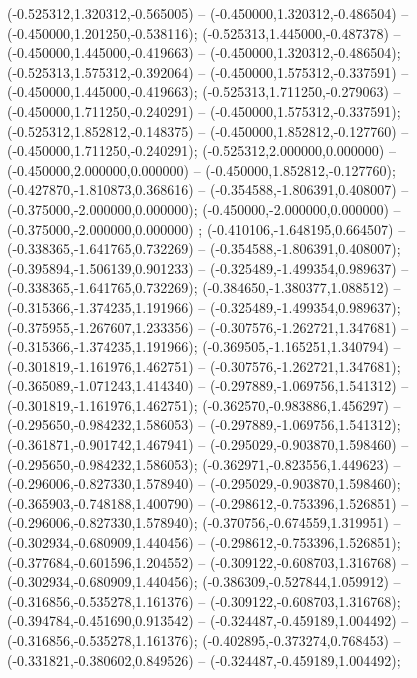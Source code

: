  (-0.525312,1.320312,-0.565005) -- (-0.450000,1.320312,-0.486504) -- (-0.450000,1.201250,-0.538116);
 (-0.525313,1.445000,-0.487378) -- (-0.450000,1.445000,-0.419663) -- (-0.450000,1.320312,-0.486504);
 (-0.525313,1.575312,-0.392064) -- (-0.450000,1.575312,-0.337591) -- (-0.450000,1.445000,-0.419663);
 (-0.525313,1.711250,-0.279063) -- (-0.450000,1.711250,-0.240291) -- (-0.450000,1.575312,-0.337591);
 (-0.525312,1.852812,-0.148375) -- (-0.450000,1.852812,-0.127760) -- (-0.450000,1.711250,-0.240291);
 (-0.525312,2.000000,0.000000) -- (-0.450000,2.000000,0.000000) -- (-0.450000,1.852812,-0.127760);
 (-0.427870,-1.810873,0.368616) -- (-0.354588,-1.806391,0.408007) -- (-0.375000,-2.000000,0.000000);
 (-0.450000,-2.000000,0.000000) -- (-0.375000,-2.000000,0.000000) ;
 (-0.410106,-1.648195,0.664507) -- (-0.338365,-1.641765,0.732269) -- (-0.354588,-1.806391,0.408007);
 (-0.395894,-1.506139,0.901233) -- (-0.325489,-1.499354,0.989637) -- (-0.338365,-1.641765,0.732269);
 (-0.384650,-1.380377,1.088512) -- (-0.315366,-1.374235,1.191966) -- (-0.325489,-1.499354,0.989637);
 (-0.375955,-1.267607,1.233356) -- (-0.307576,-1.262721,1.347681) -- (-0.315366,-1.374235,1.191966);
 (-0.369505,-1.165251,1.340794) -- (-0.301819,-1.161976,1.462751) -- (-0.307576,-1.262721,1.347681);
 (-0.365089,-1.071243,1.414340) -- (-0.297889,-1.069756,1.541312) -- (-0.301819,-1.161976,1.462751);
 (-0.362570,-0.983886,1.456297) -- (-0.295650,-0.984232,1.586053) -- (-0.297889,-1.069756,1.541312);
 (-0.361871,-0.901742,1.467941) -- (-0.295029,-0.903870,1.598460) -- (-0.295650,-0.984232,1.586053);
 (-0.362971,-0.823556,1.449623) -- (-0.296006,-0.827330,1.578940) -- (-0.295029,-0.903870,1.598460);
 (-0.365903,-0.748188,1.400790) -- (-0.298612,-0.753396,1.526851) -- (-0.296006,-0.827330,1.578940);
 (-0.370756,-0.674559,1.319951) -- (-0.302934,-0.680909,1.440456) -- (-0.298612,-0.753396,1.526851);
 (-0.377684,-0.601596,1.204552) -- (-0.309122,-0.608703,1.316768) -- (-0.302934,-0.680909,1.440456);
 (-0.386309,-0.527844,1.059912) -- (-0.316856,-0.535278,1.161376) -- (-0.309122,-0.608703,1.316768);
 (-0.394784,-0.451690,0.913542) -- (-0.324487,-0.459189,1.004492) -- (-0.316856,-0.535278,1.161376);
 (-0.402895,-0.373274,0.768453) -- (-0.331821,-0.380602,0.849526) -- (-0.324487,-0.459189,1.004492);
